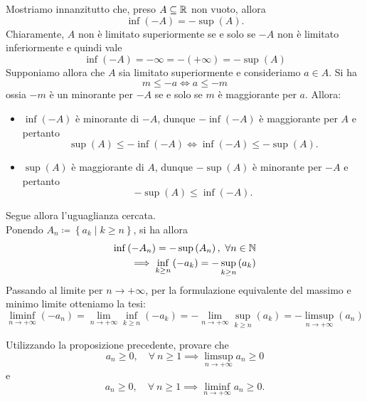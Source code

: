 \begin{solution}
	Mostriamo innanzitutto che, preso $A\subseteq\mathbb{R}$ non vuoto, allora
	\begin{equation*}
		\inf\left(-A\right)=-\sup\left(A\right).
	\end{equation*}
Chiaramente, $A$ non è limitato superiormente se e solo se $-A$ non è limitato inferiormente e quindi vale
\begin{equation*}
	\inf\left(-A\right)=-\infty=-\left(+\infty\right)=-\sup\left(A\right)
\end{equation*}
Supponiamo allora che $A$ sia limitato superiormente e consideriamo $a\in A$. Si ha
\begin{equation*}
	m\leq -a\iff a\leq -m
\end{equation*}
ossia $-m$ è un minorante per $-A$ se e solo se $m$ è maggiorante per $a$. Allora:
\begin{itemize}
	\item $\inf\left(-A\right)$ è minorante di $-A$, dunque $-\inf\left(-A\right)$ è maggiorante per $A$ e pertanto
	\begin{equation*}
		\sup\left(A\right)\leq-\inf\left(-A\right)\iff\inf\left(-A\right)\leq-\sup\left(A\right).
	\end{equation*}
\item $\sup\left(A\right)$ è maggiorante di $A$, dunque $-\sup\left(A\right)$ è minorante per $-A$ e pertanto
\begin{equation*}
	-\sup\left(A\right)\leq\inf\left(-A\right).
\end{equation*}
\end{itemize}
Segue allora l'uguaglianza cercata.\\
Ponendo	$A_n\coloneqq\left\{a_k\mid k\geq n\right\}$, si ha allora
\begin{align*}
	\inf\left(-A_n\right)=-\sup\left(A_n\right),\ \forall n\in\mathbb{N}\\
	\implies\inf_{k\geq n}\left(-a_k\right)=-\sup_{k\geq n}\left(a_k\right)
\end{align*}
Passando al limite per $n\to+\infty$, per la formulazione equivalente del massimo e minimo limite otteniamo la tesi:
\begin{equation*}
	\liminf_{n\to +\infty}\left(-a_n\right)=\lim_{n\to+\infty}\inf_{k\geq n}\left(-a_k\right)=-\lim_{n\to+\infty}\sup_{k\geq n}\left(a_k\right)=-\limsup_{n\to+\infty}\left(a_n\right)
\end{equation*}
\end{solution}
\begin{exercisewt}\label{limsuppermanenzadelsegno}
	Utilizzando la proposizione precedente, provare che
	\begin{equation*}
		a_n \geq 0,\quad \forall \ n\geq 1 \implies \limsup_{n\to +\infty} a_n\geq 0
	\end{equation*}
	e
	\begin{equation*}
		a_n \geq 0,\quad \forall \ n\geq 1 \implies \liminf_{n\to +\infty} a_n \geq 0.
	\end{equation*} 
\end{exercisewt}
